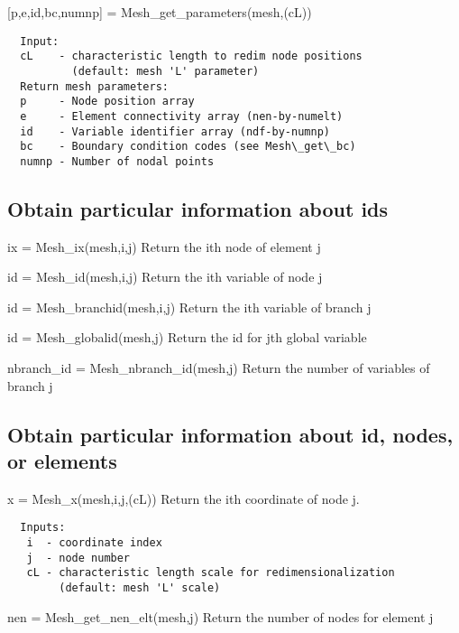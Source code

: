 \begin{codelist}
  \item[{[p,e,id,bc,numnp]} = Mesh\_get\_parameters(mesh,(cL))]
\begin{verbatim}
  Input:
  cL    - characteristic length to redim node positions
          (default: mesh 'L' parameter)
  Return mesh parameters:
  p     - Node position array
  e     - Element connectivity array (nen-by-numelt)
  id    - Variable identifier array (ndf-by-numnp)
  bc    - Boundary condition codes (see Mesh\_get\_bc)
  numnp - Number of nodal points
\end{verbatim}

\end{codelist}

\subsection{Obtain particular information about ids}
\begin{codelist}

  \item[ix = Mesh\_ix(mesh,i,j)]
  Return the ith node of element j

  \item[id = Mesh\_id(mesh,i,j)]
  Return the ith variable of node j

  \item[id = Mesh\_branchid(mesh,i,j)]
  Return the ith variable of branch j

  \item[id = Mesh\_globalid(mesh,j)]
  Return the id for jth global variable

  \item[nbranch\_id = Mesh\_nbranch\_id(mesh,j)]
  Return the number of variables of branch j

\end{codelist}

\subsection{Obtain particular information about id, nodes, or elements}
\begin{codelist}

  \item[x = Mesh\_x(mesh,i,j,(cL))]
  Return the ith coordinate of node j.
\begin{verbatim}
  Inputs:
   i  - coordinate index
   j  - node number
   cL - characteristic length scale for redimensionalization
        (default: mesh 'L' scale)
\end{verbatim}

  \item[nen = Mesh\_get\_nen\_elt(mesh,j)]
  Return the number of nodes for element j

\end{codelist}

